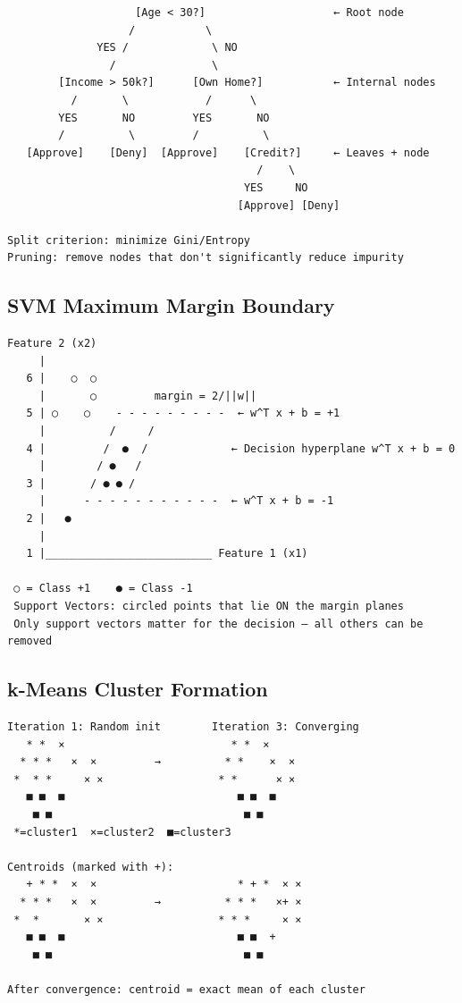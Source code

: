 \documentclass[11pt]{article}
\begin{document}
\setcodelang{}

\begin{verbatim}
                    [Age < 30?]                    ← Root node
                   /           \
              YES /             \ NO
                /               \
        [Income > 50k?]      [Own Home?]           ← Internal nodes
          /       \            /      \
        YES       NO         YES       NO
        /          \         /          \
   [Approve]    [Deny]  [Approve]    [Credit?]     ← Leaves + node
                                       /    \
                                     YES     NO
                                    [Approve] [Deny]

Split criterion: minimize Gini/Entropy
Pruning: remove nodes that don't significantly reduce impurity
\end{verbatim}

\subsection{SVM Maximum Margin Boundary}\label{svm-maximum-margin-boundary}

\setcodelang{}

\begin{verbatim}
Feature 2 (x2)
     |
   6 |    ○  ○
     |       ○         margin = 2/||w||
   5 | ○    ○    - - - - - - - - -  ← w^T x + b = +1
     |          /     /
   4 |         /  ●  /             ← Decision hyperplane w^T x + b = 0
     |        / ●   /
   3 |       / ● ● /
     |      - - - - - - - - - - -  ← w^T x + b = -1
   2 |   ●
     |
   1 |__________________________ Feature 1 (x1)

 ○ = Class +1    ● = Class -1
 Support Vectors: circled points that lie ON the margin planes
 Only support vectors matter for the decision — all others can be removed
\end{verbatim}

\subsection{k-Means Cluster Formation}\label{k-means-cluster-formation}

\setcodelang{}

\begin{verbatim}
Iteration 1: Random init        Iteration 3: Converging
   * *  ×                          * *  ×
  * * *   ×  ×         →          * *    ×  ×
 *  * *     × ×                  * *      × ×
   ■ ■  ■                           ■ ■  ■
    ■ ■                              ■ ■
 *=cluster1  ×=cluster2  ■=cluster3

Centroids (marked with +):
   + * *  ×  ×                      * + *  × ×
  * * *   ×  ×         →          * * *   ×+ ×
 *  *       × ×                  * * *     × ×
   ■ ■  ■                           ■ ■  +
    ■ ■                              ■ ■

After convergence: centroid = exact mean of each cluster
\end{verbatim}
\end{document}
